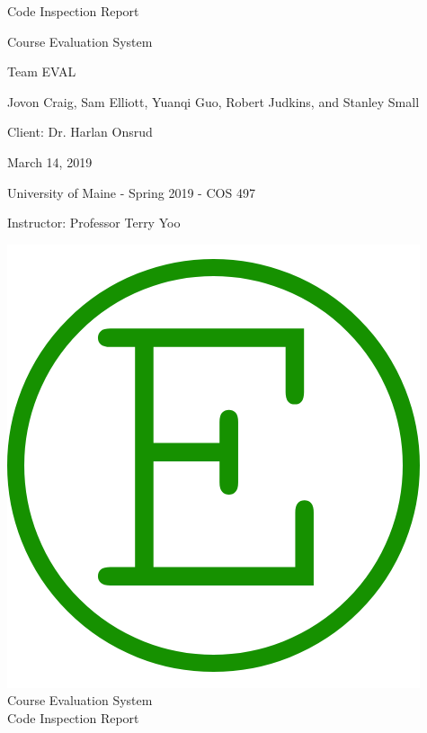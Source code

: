 \documentclass{article}
\begin{document}
\begin{titlepage}

\centering
\vspace*{2cm}
{\Huge Code Inspection Report\par}
\vspace{.25cm}
{\LARGE Course Evaluation System\par}
\vspace{1cm}
{\Large Team EVAL\par}
\vspace{.2cm}
{\Large Jovon Craig, Sam Elliott, Yuanqi Guo, Robert Judkins, and Stanley Small\par}
\vspace{1cm}
{\Large Client: Dr. Harlan Onsrud\par}
\vspace{1cm}
{\Large March 14, 2019\par}
\vspace{11cm}

University of Maine - Spring 2019 - COS 497

Instructor: Professor Terry Yoo

\end{titlepage}

\newpage

\begin{center}
{\includegraphics[scale=.2]{images/team_logo.png}} \\ 	\bigskip
{\LARGE Course Evaluation System } \\ \medskip
{\large Code Inspection Report } \\ \medskip
\end{center}
\end{document}
